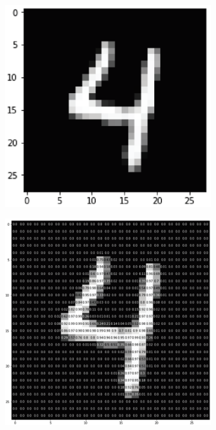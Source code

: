\begin{figure}[h!]
	\centering
	
	\begin{subfigure}{0.45\textwidth}
		\includegraphics[width=\linewidth]{Images/DataMining/DigitalImage}
		\caption{}    %
		\label{subfig:DigitalImage}
	\end{subfigure}
	\hfill
	\begin{subfigure}{0.45\textwidth}
		\includegraphics[width=\linewidth]{Images/DataMining/DigitalImagePixelValues}
		\caption{}    %
		\label{subfig:DigitalImagePixelValues}
	\end{subfigure}
	

\end{figure}
